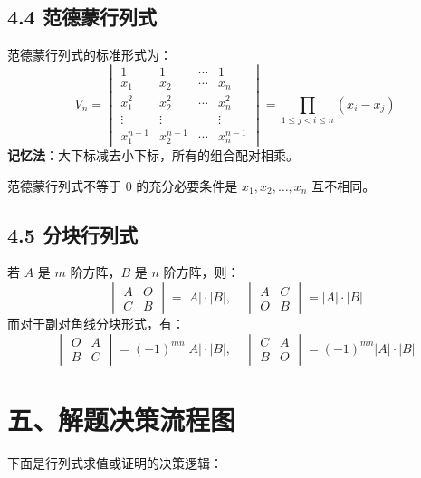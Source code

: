 \documentclass{ctexart}
\begin{document}
\subsection{4.4 范德蒙行列式}
范德蒙行列式的标准形式为：
\[
V_n = \begin{vmatrix} 1 & 1 & \cdots & 1 \\ x_1 & x_2 & \cdots & x_n \\ x_1^2 & x_2^2 & \cdots & x_n^2 \\ \vdots & \vdots & & \vdots \\ x_1^{n-1} & x_2^{n-1} & \cdots & x_n^{n-1} \end{vmatrix} = \prod_{1 \le j < i \le n}(x_i - x_j)
\]
\textbf{记忆法}：大下标减去小下标，所有的组合配对相乘。
\begin{warningbox}
  范德蒙行列式不等于 $0$ 的充分必要条件是 $x_1, x_2, \dots, x_n$ 互不相同。
\end{warningbox}

\subsection{4.5 分块行列式}
若 $A$ 是 $m$ 阶方阵，$B$ 是 $n$ 阶方阵，则：
\[
\begin{vmatrix} A & O \\ C & B \end{vmatrix} = |A| \cdot |B|, \quad \begin{vmatrix} A & C \\ O & B \end{vmatrix} = |A| \cdot |B|
\]
而对于副对角线分块形式，有：
\[
\begin{vmatrix} O & A \\ B & C \end{vmatrix} = (-1)^{mn}|A| \cdot |B|, \quad \begin{vmatrix} C & A \\ B & O \end{vmatrix} = (-1)^{mn}|A| \cdot |B|
\]

\newpage

\section{五、解题决策流程图}

下面是行列式求值或证明的决策逻辑：
\end{document}
